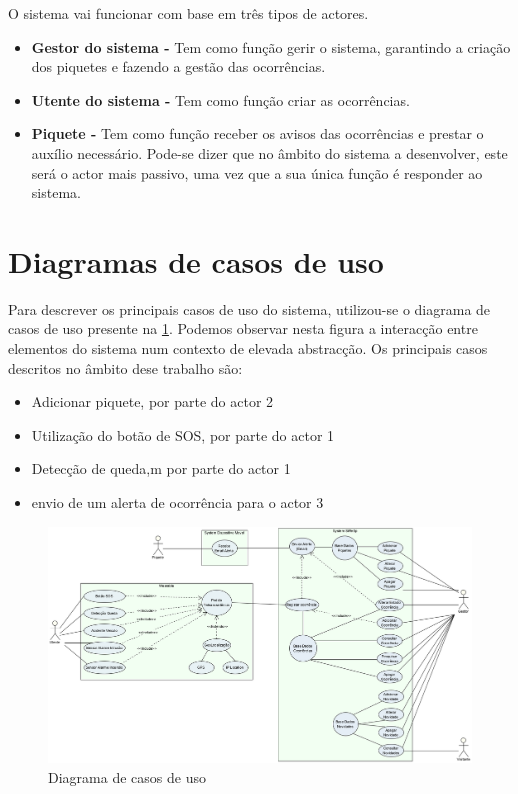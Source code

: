 O sistema vai funcionar com base em três tipos de actores.

\begin{itemize}
	\item\textbf{Gestor do sistema - }Tem como função gerir o sistema, garantindo a criação dos piquetes e fazendo a gestão das ocorrências.
	
	\item\textbf{Utente do sistema - }Tem como função criar as ocorrências.
	
	\item\textbf{Piquete - }Tem como função receber os avisos das ocorrências e prestar o auxílio necessário. Pode-se dizer que no âmbito do sistema a desenvolver, este será o actor mais passivo, uma vez que a sua única função é responder ao sistema.
\end{itemize}

\section{Diagramas de casos de uso}

Para descrever os principais casos de uso do sistema, utilizou-se o diagrama de casos de uso presente na \ref{fig:diagrama_casos_uso}. Podemos observar nesta figura a interacção entre elementos do sistema num contexto de
elevada abstracção. Os principais casos descritos no âmbito dese trabalho são:
\begin{itemize}
	\item Adicionar piquete, por parte do actor 2
	\item Utilização do botão de SOS, por parte do actor 1
	\item Detecção de queda,m por parte do actor 1
	\item envio de um alerta de ocorrência para o actor 3
\end{itemize}

\begin{figure}[!htb]
		\includegraphics[width=\textwidth]{figuras/diagrama_casos_uso.png}
		\caption{Diagrama de casos de uso}
		\label{fig:diagrama_casos_uso}
\end{figure}

